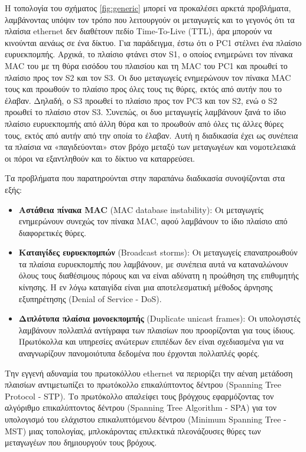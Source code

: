 \documentclass[eforms]{EdipyLabs} %
\begin{document}
H τοπολογία του σχήματος \ref{fig:generic} μπορεί να προκαλέσει αρκετά προβλήματα, λαμβάνοντας υπόψιν τον τρόπο που λειτουργούν οι μεταγωγείς και το γεγονός ότι τα πλαίσια ethernet δεν διαθέτουν πεδίο Time-To-Live (TTL), άρα μπορούν να κινούνται αενάως σε ένα δίκτυο. Για παράδειγμα, έστω ότι ο PC1 στέλνει ένα πλαίσιο ευρυεκπομπής. Αρχικά, το πλαίσιο φτάνει στον S1, ο οποίος ενημερώνει τον πίνακα MAC του με τη θύρα εισόδου του πλαισίου και τη MAC του PC1 και προωθεί το πλαίσιο προς τον S2 και τον S3. Οι δυο μεταγωγείς ενημερώνουν τον πίνακα MAC τους και προωθούν το πλαίσιο προς όλες τους τις θύρες, εκτός από αυτήν που το έλαβαν. Δηλαδή, ο S3 προωθεί το πλαίσιο προς τον PC3 και τον S2, ενώ ο S2 προωθεί το πλαίσιο στον S3. Συνεπώς, οι δυο μεταγωγείς λαμβάνουν ξανά το ίδιο πλαίσιο ευρυεκπομπής από άλλη θύρα και το προωθούν από όλες τις άλλες θύρες τους, εκτός από αυτήν από την οποία το έλαβαν. Αυτή η διαδικασία έχει ως συνέπεια τα πλαίσια να «παγιδεύονται» στον βρόχο μεταξύ των μεταγωγέων και νομοτελειακά οι πόροι να εξαντληθούν και το δίκτυο να καταρρεύσει.

Τα προβλήματα που παρατηρούνται στην παραπάνω διαδικασία συνοψίζονται στα εξής:
\begin{itemize}
	\item \textbf{Αστάθεια πίνακα MAC} (MAC database instability): Οι μεταγωγείς ενημερώνουν συνεχώς τον πίνακα MAC, αφού λαμβάνουν το ίδιο πλαίσιο από διαφορετικές θύρες.
	\item \textbf{Καταιγίδες ευρυεκπομπών} (Broadcast storms): Οι μεταγωγείς επαναπροωθούν τα πλαίσια ευρυεκπομπής που λαμβάνουν, με συνέπεια αυτά να καταναλώνουν όλους τους διαθέσιμους πόρους και να είναι αδύνατη η προώθηση της επιθυμητής κίνησης. Η εν λόγω καταιγίδα είναι μια αποτελεσματική μέθοδος άρνησης εξυπηρέτησης (Denial of Service - DoS).
	\item \textbf{Διπλότυπα πλαίσια μονοεκπομπής} (Duplicate unicast frames): Οι υπολογιστές λαμβάνουν πολλαπλά αντίγραφα των πλαισίων που προορίζονται για τους ίδιους. Πρωτόκολλα και υπηρεσίες ανώτερων επιπέδων δεν είναι σχεδιασμένα για να αναγνωρίζουν πανομοιότυπα δεδομένα που έρχονται πολλαπλές φορές.~
\end{itemize} 
Την εγγενή αδυναμία του πρωτοκόλλου ethernet να περιορίζει την αέναη μετάδοση πλαισίων αντιμετωπίζει το πρωτόκολλο επικαλύπτοντος δέντρου (Spanning Tree Protocol - STP). Το πρωτόκολλο απαλείφει τους βρόγχους εφαρμόζοντας τον αλγόριθμο επικαλύπτοντος δέντρου (Spanning Tree Algorithm - SPA) για τον υπολογισμό του ελάχιστου επικαλυπτόμενου δέντρου (Minimum Spanning Tree - MST) μιας τοπολογίας, μπλοκάροντας επιλεκτικά πλεονάζουσες θύρες των μεταγωγέων που δημιουργούν τους βρόχους. 
\end{document}
